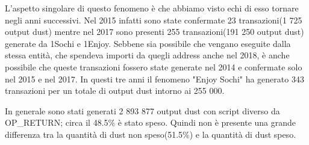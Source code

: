 L'aspetto singolare di questo fenomeno è che abbiamo visto echi di esso tornare negli anni successivi. Nel 2015 infatti sono state confermate 23 transazioni(1 725 output dust) mentre nel 2017 sono presenti 255 transazioni(191 250 output dust) generate da 1Sochi e 1Enjoy. Sebbene sia possibile che vengano eseguite dalla stessa entità, che spendeva importi da quegli address anche nel 2018, è anche possibile che queste transazioni fossero state generate nel 2014 e confermate solo nel 2015 e nel 2017. In questi tre anni il fenomeno "Enjoy Sochi" ha generato 343 transazioni per un totale di output dust intorno ai 255 000.

In generale sono stati generati 2 893 877 output dust con script diverso da OP\_RETURN; circa il 48.5\% è stato speso. Quindi non è presente una grande differenza tra la quantità di dust non speso(51.5\%) e la quantità di dust speso. 

